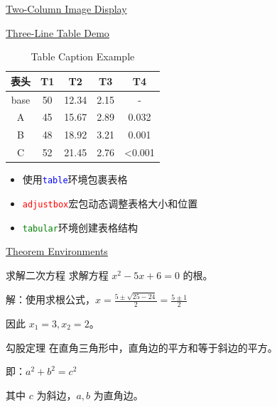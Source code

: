 \documentclass[11pt,aspectratio=43,xcolor={dvipsnames},hyperref={pdftex,pdfpagemode=UseNone,hidelinks,pdfdisplaydoctitle=true},usepdftitle=false]{ctexbeamer}
\begin{document}
\begin{frame}{\underline{Two-Column Image Display}}
  \vspace{0.5cm}
\end{frame}

\begin{frame}{\underline{Three-Line Table Demo}}
  \centering
  
\begin{table}[h]
  \centering
  \caption{Table Caption Example}
  \begin{adjustbox}{width=0.5\textwidth,center}
    \begin{tabular}{c|c|c|c|c}
      \toprule
      \textbf{表头} & \textbf{T1} & \textbf{T2} & \textbf{T3} & \textbf{T4} \\
      \midrule
      base & 50 & 12.34 & 2.15 & - \\
      A & 45 & 15.67 & 2.89 & 0.032 \\
      B & 48 & 18.92 & 3.21 & 0.001 \\
      C & 52 & 21.45 & 2.76 & <0.001 \\
      \bottomrule
    \end{tabular}
  \end{adjustbox}
\end{table} 
  \vspace{0.3cm}
  
  \begin{itemize}
    \item 使用\texttt{\textcolor{blue}{table}}环境包裹表格
    \item \texttt{\textcolor{red}{adjustbox}}宏包动态调整表格大小和位置
    \item \texttt{\textcolor{green}{tabular}}环境创建表格结构
  \end{itemize}
\end{frame}

\begin{frame}{\underline{Theorem Environments}}
  \begin{chdexample}{求解二次方程}
    求解方程 $x^2 - 5x + 6 = 0$ 的根。
    
    解：使用求根公式，$x = \frac{5 \pm \sqrt{25-24}}{2} = \frac{5 \pm 1}{2}$
    
    因此 $x_1 = 3, x_2 = 2$。
  \end{chdexample}
  \begin{chdtheorem}{勾股定理}
    在直角三角形中，直角边的平方和等于斜边的平方。
    
    即：$a^2 + b^2 = c^2$
    
    其中 $c$ 为斜边，$a, b$ 为直角边。
  \end{chdtheorem}
\end{frame}
\end{document}
